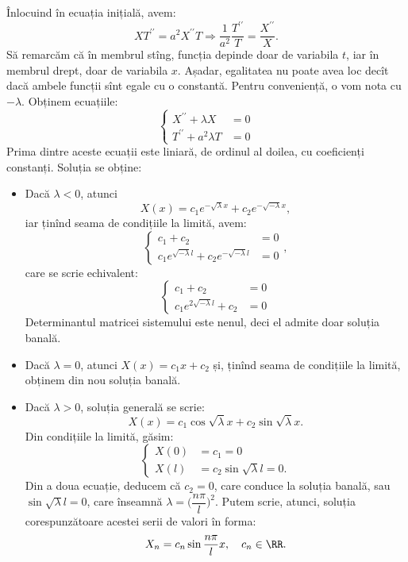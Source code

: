 Înlocuind în ecuația inițială, avem:
\[
    XT^{\prime\prime} = a^2X^{\prime\prime} T \Rightarrow %
    \dfrac{1}{a^2} \dfrac{T^{\prime\prime}}{T} = \dfrac{X^{\prime\prime}}{X}.
\]
Să remarcăm că în membrul stîng, funcția depinde doar de variabila $ t $, iar în
membrul drept, doar de variabila $ x $. Așadar, egalitatea nu poate avea loc
decît dacă ambele funcții sînt egale cu o constantă. Pentru conveniență, o vom nota
cu $ -\lambda $. Obținem ecuațiile:
\[
    \begin{cases}
        X^{\prime\prime} + \lambda X &= 0 \\
        T^{\prime\prime} + a^2\lambda T &= 0
    \end{cases}
\]
Prima dintre aceste ecuații este liniară, de ordinul al doilea, cu coeficienți
constanți. Soluția se obține:
\begin{itemize}
    \item Dacă $ \lambda < 0 $, atunci
        \[
            X(x) = c_1 e^{-\sqrt{\lambda}x} + c_2 e^{-\sqrt{-\lambda} x},
        \]
        iar ținînd seama de condițiile la limită, avem:
        \[
            \begin{cases}
                c_1 + c_2 &= 0 \\
                c_1 e^{\sqrt{-\lambda} l} + c_2e^{-\sqrt{-\lambda} l} &= 0
            \end{cases},
        \]
        care se scrie echivalent:
        \[
            \begin{cases}
                c_1 + c_2 &= 0 \\
                c_1 e^{2\sqrt{-\lambda} l} + c_2 &= 0
            \end{cases}
        \]
        Determinantul matricei sistemului este nenul, deci el admite doar soluția banală.
    \item Dacă $ \lambda = 0 $, atunci $ X(x) = c_1 x + c_2 $ și, ținînd seama de
        condițiile la limită, obținem din nou soluția banală.
    \item Dacă $ \lambda > 0 $, soluția generală se scrie:
        \[
            X(x) = c_1 \cos \sqrt{\lambda} x + c_2 \sin \sqrt{\lambda} x.
        \]
        Din condițiile la limită, găsim:
        \[
            \begin{cases}
                X(0) &= c_1 = 0 \\
                X(l) &= c_2 \sin \sqrt{\lambda} l = 0.
            \end{cases}
        \]
        Din a doua ecuație, deducem că $ c_2 = 0 $, care conduce la soluția banală, sau
        $ \sin \sqrt{\lambda} l = 0 $, care înseamnă $ \lambda = \big(\dfrac{n\pi}{l}\big)^2 $.
        Putem scrie, atunci, soluția corespunzătoare acestei serii de valori în forma:
        \[
            X_n = c_n \sin \dfrac{n\pi}{l} x, \quad c_n \in \RR.
        \]
\end{itemize}

